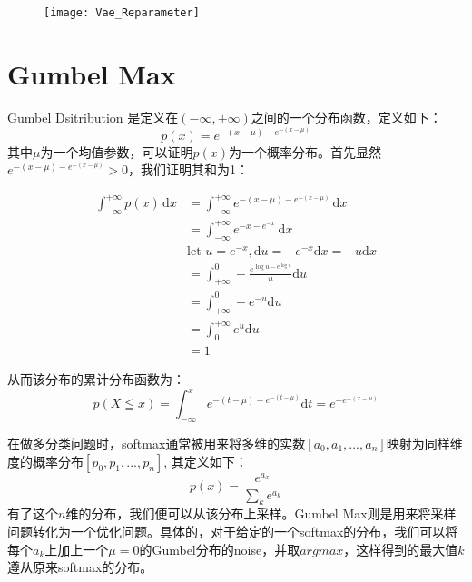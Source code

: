 \begin{figure}[htbp]
\centering
\texttt{[image: Vae\_Reparameter]}
\end{figure}

\section{Gumbel Max}

Gumbel Dsitribution 是定义在$(-\infty, +\infty)$之间的一个分布函数，定义如下：
\begin{displaymath}
p(x)=e^{-(x-\mu)-e^{-(x-\mu)}}
\end{displaymath}
其中$\mu$为一个均值参数，可以证明$p(x)$为一个概率分布。首先显然$e^{-(x-\mu)-e^{-(x-\mu)}}>0$，我们证明其和为1：

\begin{displaymath}
\begin{split}
\int_{-\infty}^{+\infty}p(x)\,\mathrm{d}x &=\int_{-\infty}^{+\infty}e^{-(x-\mu)-e^{-(x-\mu)}}\,\mathrm{d}x\\
&=\int_{-\infty}^{+\infty}e^{-x-e^{-x}}\,\mathrm{d}x\\
&\text{let } u=e^{-x}, \mathrm{d}u=-e^{-x}\mathrm{d}x=-u\mathrm{d}x\\
&=\int_{+\infty}^{0}-\frac{e^{\log{u}-e^{\log{u}}}}{u}\mathrm{d}u\\
&=\int_{+\infty}^{0}-e^{-u}\mathrm{d}u\\
&=\int_{0}^{+\infty}e^{u}\mathrm{d}u\\
&=1
\end{split}
\end{displaymath}

从而该分布的累计分布函数为： 
\begin{displaymath}
p(X \leqq x)=\int_{-\infty}^{x}e^{-(t-\mu)-e^{-(t-\mu)}}\mathrm{d}t =e^{-e^{-(x-\mu)}}
\end{displaymath}

在做多分类问题时，softmax通常被用来将多维的实数$[a_0, a_1, ... ,a_n]$映射为同样维度的概率分布$[p_0, p_1, ..., p_n]$, 其定义如下：
\begin{displaymath}
p(x)=\frac{e^{a_x}}{\sum_k{e^{a_k}}}
\end{displaymath}
有了这个$n$维的分布，我们便可以从该分布上采样。Gumbel Max则是用来将采样问题转化为一个优化问题。具体的，对于给定的一个softmax的分布，我们可以将每个$a_k$上加上一个$\mu=0$的Gumbel分布的noise，并取$argmax$，这样得到的最大值$k$遵从原来softmax的分布。

